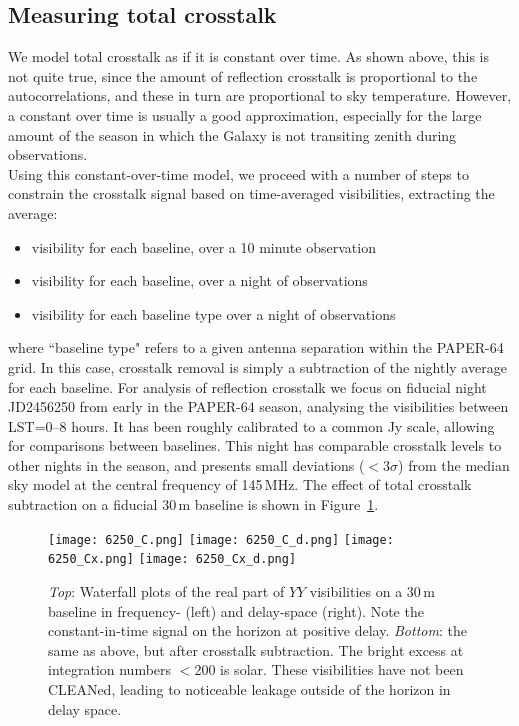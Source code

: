 \documentclass[10pt,a4paper,notitlepage]{article}
\begin{document}
\subsection{Measuring total crosstalk}
\label{subsec:method_xtalk}
We model total crosstalk as if it is constant over time. As shown above, this is not quite true, since the amount of reflection crosstalk is proportional to the autocorrelations, and these in turn are proportional to sky temperature. However, a constant over time is usually a good approximation, especially for the large amount of the season in which the Galaxy is not transiting zenith during observations.\\

Using this constant-over-time model, we proceed with a number of steps to constrain the crosstalk signal based on time-averaged visibilities, extracting the average:
\begin{itemize}
\item  visibility for each baseline, over a 10 minute observation
\item  visibility for each baseline, over a night of observations
\item  visibility for each baseline type over a night of observations
\end{itemize}
\noindent where ``baseline type" refers to a given antenna separation within the PAPER-64 grid. In this case, crosstalk removal is simply a subtraction of the nightly average for each baseline. For analysis of reflection crosstalk we focus on fiducial night JD2456250 from early in the PAPER-64 season, analysing the visibilities between LST=0--8 hours. It has been roughly calibrated to a common Jy scale, allowing for comparisons between baselines. This night has comparable crosstalk levels to other nights in the season, and presents small deviations ($<3\sigma$) from the median sky model at the central frequency of 145\,MHz. The effect of total crosstalk subtraction on a fiducial 30\,m baseline is shown in Figure~\ref{fig:waterfalls}.

\begin{figure}
\centering
\texttt{[image: 6250\_C.png]}
\texttt{[image: 6250\_C\_d.png]}
\texttt{[image: 6250\_Cx.png]}
\texttt{[image: 6250\_Cx\_d.png]}
\caption{\textit{Top}: Waterfall plots of the real part of $YY$ visibilities on a 30\,m baseline in frequency- (left) and delay-space (right). Note the constant-in-time signal on the horizon at positive delay. \textit{Bottom}: the same as above, but after crosstalk subtraction. The bright excess at integration numbers $<$200 is solar. These visibilities have not been CLEANed, leading to noticeable leakage outside of the horizon in delay space.}
\label{fig:waterfalls}
\end{figure}
\end{document}
